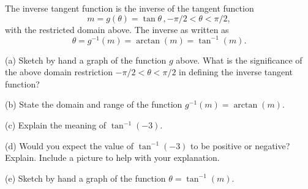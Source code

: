 \documentclass{ximera}
\begin{document}
The inverse tangent function is the inverse of the tangent function
\[
   m = g(\theta) = \tan \theta \, , -\pi/2 < \theta < \pi/2 ,
\]
with the restricted domain above. The inverse as written as
\[
    \theta = g^{-1}(m) = \arctan (m) = \tan^{-1}(m) .
\]

\begin{question} \label{Q12:InverseTrig}

(a) Sketch by hand a graph of the function $g$ above. What is the significance of the above domain restriction $-\pi/2 < \theta < \pi/2$  in defining the inverse tangent function?

(b) State the domain and range of the function $g^{-1}(m) = \arctan (m)$.

(c) Explain the meaning of $\tan^{-1}(-3)$.

(d) Would you expect the value of $\tan^{-1}(-3)$ to be positive or negative? Explain. Include a picture to help with your explanation.

(e) Sketch by hand a graph of the function $\theta =  \tan^{-1}(m) $.

\end{question}
\end{document}
